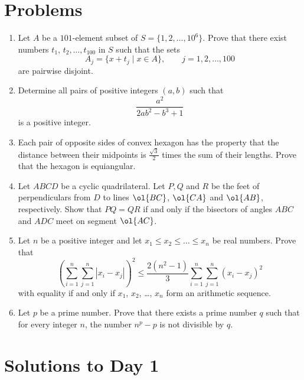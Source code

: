 \documentclass[11pt]{scrartcl}
\begin{document}
\section{Problems}
\begin{enumerate}[\bfseries 1.]
\item %
Let $A$ be a $101$-element subset of $S=\{1,2,\dots,10^6\}$.
Prove that there exist numbers $t_1$, $t_2, \dots, t_{100}$ in $S$ such that the sets
\[ A_j=\{x+t_j\mid x\in A\},\qquad j=1,2,\dots,100  \]
are pairwise disjoint.

\item %
Determine all pairs of positive integers $(a,b)$ such that
\[ \frac{a^2}{2ab^2-b^3+1} \]
is a positive integer.

\item %
Each pair of opposite sides of convex hexagon has the property that
the distance between their midpoints is $\frac{\sqrt3}{2}$
times the sum of their lengths.
Prove that the hexagon is equiangular.

\item %
Let $ABCD$ be a cyclic quadrilateral.
Let $P, Q$ and $R$ be the feet of perpendiculars
from $D$ to lines $\ol{BC}$, $\ol{CA}$ and $\ol{AB}$, respectively.
Show that $PQ = QR$ if and only if the
bisectors of angles $ABC$ and $ADC$ meet on segment $\ol{AC}$.

\item %
Let $n$ be a positive integer and
let $x_1 \le x_2 \le \dots \le x_n$ be real numbers.
Prove that
\[ \left(\sum_{i=1}^{n}\sum_{j=1}^{n} |x_i - x_j|\right)^2
  \le \frac{2(n^2-1)}{3}\sum_{i=1}^{n}\sum_{j=1}^{n} (x_i - x_j)^2 \]
with equality if and only if $x_1$, $x_2$, \dots, $x_n$
form an arithmetic sequence.

\item %
Let $p$ be a prime number.
Prove that there exists a prime number $q$
such that for every integer $n$,
the number $n^p-p$ is not divisible by $q$.

\end{enumerate}
\pagebreak

\section{Solutions to Day 1}
\end{document}
